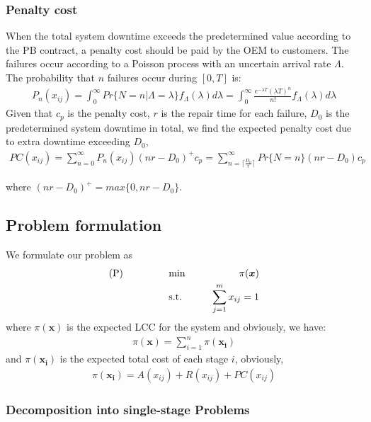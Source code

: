 \documentclass[preprint,12pt]{elsarticle}
\begin{document}
\subsubsection{Penalty cost}
When the total system downtime exceeds the predetermined value according to the PB contract, a penalty cost should be paid by the OEM to customers. The failures occur according to a Poisson process with an uncertain arrival rate $\Lambda$. The probability that $n$ failures occur during $[0, T]$ is:
\begin {eqnarray}
P_{n}(x_{ij})=\int^{\infty}_{0}{Pr\{N=n|\Lambda=\lambda\}f_{\Lambda}}(\lambda)d\lambda=\int^{\infty}_{0}\frac{e^{-\lambda T}(\lambda T)^n}{n!}f_{\Lambda}(\lambda)d\lambda
\end {eqnarray}
Given that $c_p$ is the penalty cost, $r$ is the repair time for each failure, $D_0$ is the predetermined system downtime in total, we find the expected penalty cost due to extra downtime exceeding $D_0$,
\begin {eqnarray}
PC(x_{ij})=\sum_{n=0}^{\infty}{P_{n}(x_{ij})(nr-D_{0})^{+}c_{p}}=\sum_{n=\lceil \frac{D_{0}}{r} \rceil}^{\infty}{Pr\{N=n\}(nr-D_{0})c_{p}}
\end {eqnarray}

where $(nr-D_{0})^{+}=max\{0,nr-D_0\}$.

\subsection{Problem formulation}
We formulate our problem as
\begin{eqnarray}
\text{(P)} \hspace{15mm} &\text{ min }& \hspace{10mm} \pi(\boldsymbol{x}) \nonumber\\
& \text{ s.t. }&  \hspace{5mm} \sum_{j=1}^{m}{x_{ij}}=1 \nonumber
\end{eqnarray}
where $\pi(\boldsymbol{x})$ is the expected LCC for the system and obviously, we have:
\begin{eqnarray}
\pi(\boldsymbol{x})=\sum_{i=1}^{n}{\pi(\boldsymbol{x_{i}})} \nonumber
\end{eqnarray}
and $\pi(\boldsymbol{x_{i}})$ is the expected total cost of each stage $i$, obviously,
\begin{eqnarray}
\pi(\boldsymbol{x_{i}})=A(x_{ij})+R(x_{ij})+PC(x_{ij}) \nonumber
\end{eqnarray}
\subsubsection{Decomposition into single-stage Problems}
	
   	
\end{document}
